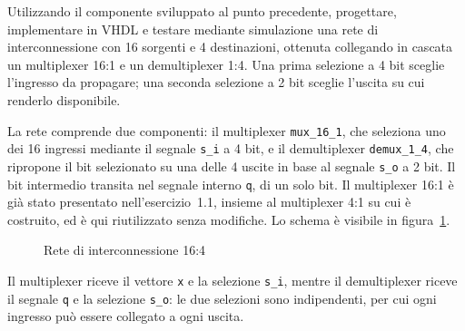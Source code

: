 \label{sec:esercizio1-2}

\begin{traccia}
Utilizzando il componente sviluppato al punto precedente, progettare, implementare in VHDL e testare mediante simulazione una rete di interconnessione con 16 sorgenti e 4 destinazioni, ottenuta collegando in cascata un multiplexer 16:1 e un demultiplexer 1:4. Una prima selezione a 4 bit sceglie l'ingresso da propagare; una seconda selezione a 2 bit sceglie l'uscita su cui renderlo disponibile.
\end{traccia}

\progetto

La rete comprende due componenti: il multiplexer \texttt{mux\_16\_1}, che seleziona uno dei 16 ingressi mediante il segnale \texttt{s\_i} a 4 bit, e il demultiplexer \texttt{demux\_1\_4}, che ripropone il bit selezionato su una delle 4 uscite in base al segnale \texttt{s\_o} a 2 bit. Il bit intermedio transita nel segnale interno \texttt{q}, di un solo bit. Il multiplexer 16:1 è già stato presentato nell'esercizio~1.1, insieme al multiplexer 4:1 su cui è costruito, ed è qui riutilizzato senza modifiche. Lo schema è visibile in figura~\ref{fig:esercizio1-2:schema}.

\begin{figure}[H]
  \centering
  \caption{Rete di interconnessione 16:4}
  \label{fig:esercizio1-2:schema}
\end{figure}

Il multiplexer riceve il vettore \texttt{x} e la selezione \texttt{s\_i}, mentre il demultiplexer riceve il segnale \texttt{q} e la selezione \texttt{s\_o}: le due selezioni sono indipendenti, per cui ogni ingresso può essere collegato a ogni uscita.


